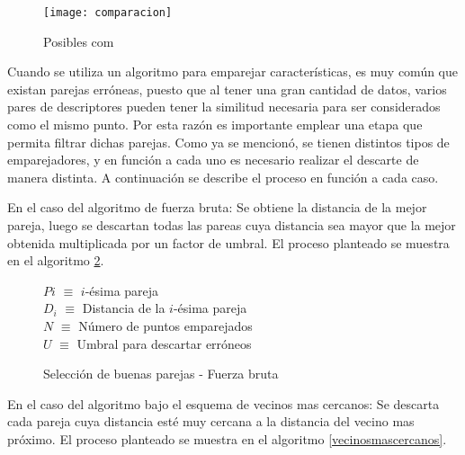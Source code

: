\begin{figure}[H]
	\centering
	\texttt{[image: comparacion]}
	\caption[Combinación de algoritmos para el analisis de rendimiento]{Posibles com}
	\label{imagen:comparacion}
\end{figure}

Cuando se utiliza un algoritmo para emparejar características, es muy común que existan parejas erróneas, puesto que al tener una gran cantidad de datos, varios pares de descriptores pueden tener la similitud necesaria para ser considerados como el mismo punto. Por esta razón es importante emplear una etapa que permita filtrar dichas parejas. Como ya se mencionó, se tienen distintos tipos de emparejadores, y en función a cada uno es necesario realizar el descarte de manera distinta. A continuación se describe el proceso en función a cada caso.

En el caso del algoritmo de fuerza bruta: Se obtiene la distancia de la mejor pareja, luego se descartan todas las pareas cuya distancia sea mayor que la mejor obtenida multiplicada por un factor de umbral. El proceso planteado se muestra en el algoritmo \ref{fuerzabruta}.

\begin{figure}[h]
	\centering
	\begin{minipage}{.7\linewidth}
		\begin{algorithm}[H] %
			\caption{Selección de buenas parejas - Fuerza bruta}
			\label{fuerzabruta}
			\SetAlgoLined
			$P{i}$ $\equiv$  $i$-ésima pareja\\
			$D_{i}$ $\equiv$ Distancia de la $i$-ésima pareja\\
			$N$ $\equiv$ Número de puntos emparejados\\
			$U$ $\equiv$ Umbral para descartar erróneos\\
			
		\end{algorithm}
	\end{minipage}
\end{figure}

En el caso del algoritmo bajo el esquema de vecinos mas cercanos: Se descarta cada pareja cuya distancia esté muy cercana a la distancia del vecino mas próximo. El proceso planteado se muestra en el algoritmo \ref{vecinosmascercanos}.


